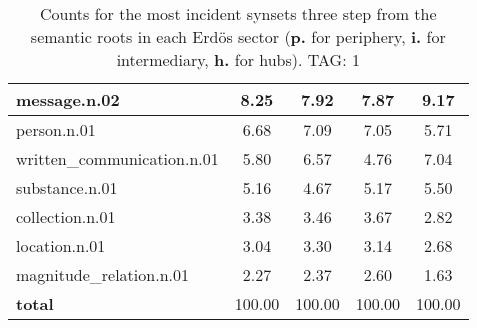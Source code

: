 \begin{table}[h!]
\begin{center}
\begin{tabular}{| l || c | c | c | c |}
message.n.02 & 8.25  & 7.92  & 7.87  & 9.17 \\\hline
person.n.01 & 6.68  & 7.09  & 7.05  & 5.71 \\\hline
written\_communication.n.01 & 5.80  & 6.57  & 4.76  & 7.04 \\\hline
substance.n.01 & 5.16  & 4.67  & 5.17  & 5.50 \\\hline
collection.n.01 & 3.38  & 3.46  & 3.67  & 2.82 \\\hline
location.n.01 & 3.04  & 3.30  & 3.14  & 2.68 \\\hline
magnitude\_relation.n.01 & 2.27  & 2.37  & 2.60  & 1.63 \\\hline\hline
{{\bf total}} & 100.00  & 100.00  & 100.00  & 100.00 \\\hline
\end{tabular}
\caption{Counts for the most incident synsets three step from the semantic roots in each Erd\"os sector ({\bf p.} for periphery, {\bf i.} for intermediary, {\bf h.} for hubs). TAG: 1}
\end{center}
\end{table}